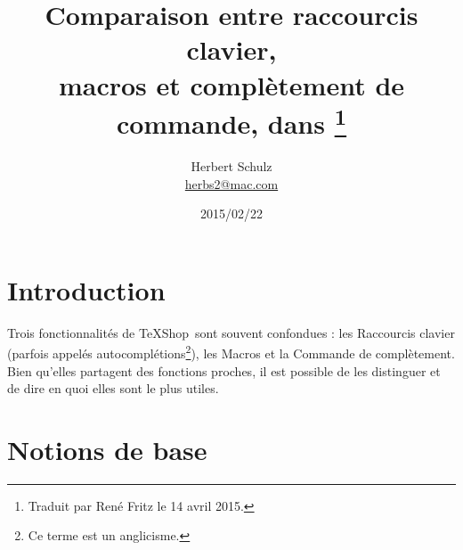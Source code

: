 \documentclass[11pt,french]{article}
\title{Comparaison entre raccourcis clavier,\\ macros et complètement de commande, dans \TS\thanks{Traduit par René Fritz le 14 avril 2015.}}
\author{Herbert Schulz\\\small\href{mailto:herbs2@mac.com}{herbs2@mac.com}}
\date{2015/02/22}
\newcommand{\cmdkey}{\textsf{cmd}}
\newcommand{\esckey}{\textsf{esc}}
\newcommand{\tabkey}{---\kern-5pt>|}
\newcommand{\cmd}[1]{\textsf{#1}}
\newcommand{\TS}{\textsf{\TeX Shop}}
\begin{document}
\maketitle

\section{Introduction}



Trois fonctionnalités de \TS\ sont souvent confondues : les \cmd{Raccourcis clavier} (parfois appelés autocomplétions\footnote{Ce terme est un anglicisme.}), les \cmd{Macros} et la \cmd{Commande de complètement}. Bien qu'elles partagent des fonctions proches, il est possible de les distinguer et de dire en quoi elles sont le plus utiles.

\section{Notions de base}

%
%
\end{document}
